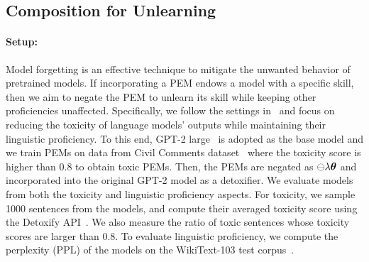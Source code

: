  

\subsection{Composition for Unlearning}
\label{sec:neg}

\paragraph{Setup:}
Model forgetting is an effective technique to mitigate the unwanted behavior of pretrained models. 
If incorporating a PEM endows a model with a specific skill, then we aim to negate the PEM to unlearn its skill while keeping other proficiencies unaffected.
Specifically, we follow the settings in~\citet{ilharco2022editing} and focus on reducing the toxicity of language models' outputs while maintaining their linguistic proficiency. 
To this end, GPT-2 large~\citep{radford2019language} is adopted as the base model and we train PEMs on data from Civil Comments dataset~\citep{borkan2019nuanced} where the toxicity score is higher than 0.8 to obtain toxic PEMs. 
Then, the PEMs are negated as $\ominus\lambda{\bm{\theta}}$ and incorporated into the original GPT-2 model as a detoxifier.
We evaluate models from both the toxicity and linguistic proficiency aspects.
For toxicity, we sample 1000 sentences from the models, and compute their averaged toxicity score using the Detoxify API~\citep{hanuunitary}. 
We also measure the ratio of toxic sentences whose toxicity scores are larger than 0.8.
To evaluate linguistic proficiency, we compute the perplexity (PPL) of the models on the WikiText-103 test corpus~\citep{merity2016pointer}.  

